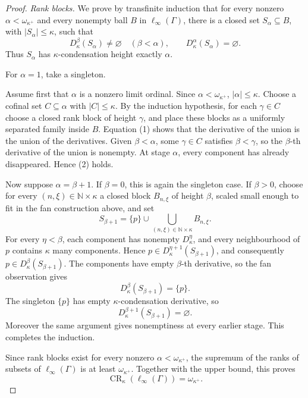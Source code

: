 \documentclass[11pt]{article}
\newcommand{\card}[1]{\left|#1\right|}
\newcommand{\CR}{\operatorname{CR}}
\begin{document}
\begin{proof}
\medskip
\noindent\emph{Rank blocks.}
We prove by transfinite induction that for every nonzero
\(\alpha<\omega_{\kappa^+}\) and every nonempty ball \(B\) in
\(\ell_\infty(\Gamma)\), there is a closed set \(S_\alpha\subseteq B\), with
\(\card{S_\alpha}\leq\kappa\), such that
\[
D_\kappa^\beta(S_\alpha)\neq\varnothing\quad(\beta<\alpha),
\qquad
D_\kappa^\alpha(S_\alpha)=\varnothing. \tag{2}
\]
Thus \(S_\alpha\) has \(\kappa\)-condensation height exactly \(\alpha\).

For \(\alpha=1\), take a singleton.

Assume first that \(\alpha\) is a nonzero limit ordinal.  Since
\(\alpha<\omega_{\kappa^+}\), \(\card{\alpha}\leq \kappa\).  Choose a cofinal
set \(C\subseteq \alpha\) with \(\card{C}\leq\kappa\).  By the induction
hypothesis, for each \(\gamma\in C\) choose a closed rank block of height
\(\gamma\), and place these blocks as a uniformly separated family inside
\(B\).  Equation (1) shows that the derivative of the union is the union of
the derivatives.  Given \(\beta<\alpha\), some \(\gamma\in C\) satisfies
\(\beta<\gamma\), so the \(\beta\)-th derivative of the union is nonempty.
At stage \(\alpha\), every component has already disappeared.  Hence (2)
holds.

Now suppose \(\alpha=\beta+1\).  If \(\beta=0\), this is again the singleton
case.  If \(\beta>0\), choose for every \((n,\xi)\in\mathbb N\times\kappa\)
a closed block \(B_{n,\xi}\) of height \(\beta\), scaled small enough to fit
in the fan construction above, and set
\[
S_{\beta+1}=\{p\}\cup\bigcup_{(n,\xi)\in\mathbb N\times\kappa}B_{n,\xi}.
\]
For every \(\eta<\beta\), each component has nonempty
\(D_\kappa^\eta\), and every neighbourhood of \(p\) contains \(\kappa\) many
components.  Hence \(p\in D_\kappa^{\eta+1}(S_{\beta+1})\), and consequently
\(p\in D_\kappa^\beta(S_{\beta+1})\).  The components have empty
\(\beta\)-th derivative, so the fan observation gives
\[
D_\kappa^\beta(S_{\beta+1})=\{p\}.
\]
The singleton \(\{p\}\) has empty \(\kappa\)-condensation derivative, so
\[
D_\kappa^{\beta+1}(S_{\beta+1})=\varnothing.
\]
Moreover the same argument gives nonemptiness at every earlier stage.  This
completes the induction.

Since rank blocks exist for every nonzero
\(\alpha<\omega_{\kappa^+}\), the supremum of the ranks of subsets of
\(\ell_\infty(\Gamma)\) is at least \(\omega_{\kappa^+}\).  Together with the
upper bound, this proves
\[
\CR_\kappa(\ell_\infty(\Gamma))=\omega_{\kappa^+}.
\]
\end{proof}
\end{document}
